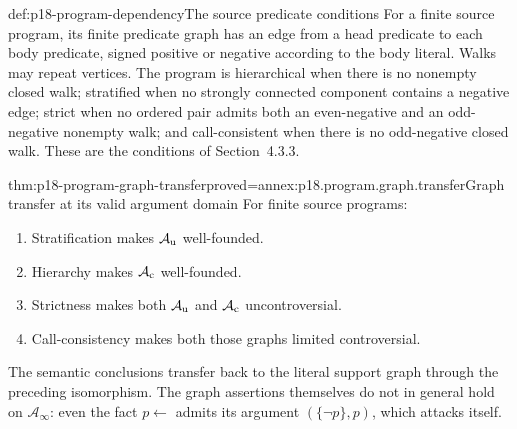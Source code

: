 \begin{hbdefinition}{def:p18-program-dependency}{The source predicate conditions}
For a finite source program, its finite predicate
graph has an edge from a head predicate to
each body predicate, signed positive or negative
according to the body literal. Walks may repeat
vertices. The program is hierarchical when
there is no nonempty closed walk; stratified
when no strongly connected component contains
a negative edge; strict when no ordered pair
admits both an even-negative and an odd-negative
nonempty walk; and call-consistent when there
is no odd-negative closed walk.
These are the conditions of Section~4.3.3.
\end{hbdefinition}

\begin{hbtheorem}{thm:p18-program-graph-transfer}{proved=annex:p18.program.graph.transfer}{Graph transfer at its valid argument domain}
For finite source programs:
\begin{enumerate}
\item Stratification makes \(\mathcal A_{\rm u}\) well-founded.
\item Hierarchy makes \(\mathcal A_{\rm c}\) well-founded.
\item Strictness makes both \(\mathcal A_{\rm u}\)
      and \(\mathcal A_{\rm c}\) uncontroversial.
\item Call-consistency makes both those graphs
      limited controversial.
\end{enumerate}
The semantic conclusions transfer back to
the literal support graph through the
preceding isomorphism. The graph assertions
themselves do not in general hold on
\(\mathcal A_\infty\): even the fact
\(p\leftarrow\) admits its argument
\((\{\neg p\},p)\), which attacks itself.
\end{hbtheorem}

